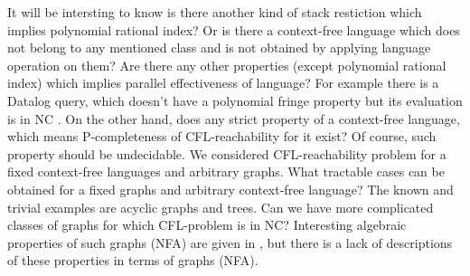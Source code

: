 \documentclass[smallextended]{svjour3}       %
\begin{document}
It will be intersting to know is there another kind of stack restiction which implies polynomial rational index? Or is there a context-free language which does not belong to any mentioned class and is not obtained by applying language operation on them? Are there any other properties (except polynomial rational index) which implies parallel effectiveness of language? For example there is a Datalog query, which doesn't have a polynomial fringe property but its evaluation is in NC \cite{Kanellakis}. On the other hand, does any strict property of a context-free language, which means P-completeness of CFL-reachability for it exist? Of course, such property should be undecidable.
We considered CFL-reachability problem for a fixed context-free languages and arbitrary graphs. What tractable cases can be obtained for a fixed graphs and arbitrary context-free language? The known and trivial examples are acyclic graphs and trees. Can we have more complicated classes of graphs for which CFL-problem is in NC? Interesting algebraic properties of such graphs (NFA) are given in \cite{ganardi2016circuit}, but there is a lack of descriptions of these properties in terms of graphs (NFA). 
\end{document}
